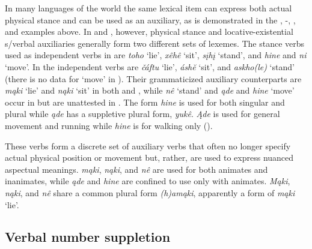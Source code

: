 \documentclass[output=paper]{LSP/langsci}
\begin{document}
In many languages of the world the same lexical item can express both actual physical stance and can be used as an auxiliary, as is demonstrated in the , -, , and  examples above. In  and , however, physical stance and locative-existential s/verbal auxiliaries generally form two different sets of lexemes. The stance verbs used as independent verbs in  are \emph{toho} `lie', \emph{xêhê} `sit', \emph{sįhį} `stand', and \emph{hine} and \emph{ni} `move'. In  the independent verbs are \emph{čáftu} `lie', \emph{áshĕ} `sit', and \emph{askho(le)} `stand' (there is no data for `move' in ). Their grammaticized auxiliary counterparts are \emph{mąki} `lie' and \emph{nąki} `sit' in both  and , while \emph{nê} `stand' and \emph{ąde} and \emph{hine} `move' occur in  but are unattested in . The  form \emph{hine} is used for both singular and plural while \emph{ąde} has a suppletive plural form, \emph{yukê}. \emph{Ąde} is used for general movement and running while \emph{hine} is for walking only (\citealt[3]{Kaufman2013}). 

These verbs form a discrete set of auxiliary verbs that often no longer specify actual physical position or movement but, rather, are used to express nuanced aspectual meanings.  \emph{mąki}, \emph{nąki}, and \emph{nê} are used for both animates and inanimates, while \emph{ąde} and \emph{hine} are confined to use only with animates. \emph{Mąki}, \emph{nąki}, and \emph{nê} share a common plural form \emph{(h)amąki}, apparently a form of \emph{mąki} `lie'. 
 
\subsection{Verbal number suppletion}
\end{document}
